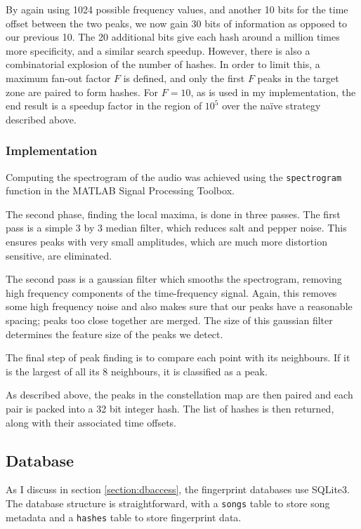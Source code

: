 \documentclass[12pt,a4paper,twoside,openright]{report}
\begin{document}
By again using 1024 possible frequency values, and another 10 bits for the time offset between the two peaks, we now gain 30 bits of information as opposed to our previous 10. The 20 additional bits give each hash around a million times more specificity, and a similar search speedup. However, there is also a combinatorial explosion of the number of hashes. In order to limit this, a maximum fan-out factor $F$ is defined, and only the first $F$ peaks in the target zone are paired to form hashes. For $F=10$, as is used in my implementation, the end result is a speedup factor in the region of $10^5$ over the na{\"i}ve strategy described above.

\subsubsection{Implementation}

Computing the spectrogram of the audio was achieved using the \lstinline{spectrogram} function in the MATLAB Signal Processing Toolbox.

The second phase, finding the local maxima, is done in three passes. The first pass is a simple 3 by 3 median filter, which reduces salt and pepper noise. This ensures peaks with very small amplitudes, which are much more distortion sensitive, are eliminated. 

The second pass is a gaussian filter which smooths the spectrogram, removing high frequency components of the time-frequency signal. Again, this removes some high frequency noise and also makes sure that our peaks have a reasonable spacing; peaks too close together are merged. The size of this gaussian filter determines the feature size of the peaks we detect. 

The final step of peak finding is to compare each point with its neighbours. If it is the largest of all its 8 neighbours, it is classified as a peak.

As described above, the peaks in the constellation map are then paired and each pair is packed into a 32 bit integer hash. The list of hashes is then returned, along with their associated time offsets.


\subsection{Database}
\label{shazam:db}

As I discuss in section \ref{section:dbaccess}, the fingerprint databases use SQLite3. The database structure is straightforward, with a \lstinline{songs} table to store song metadata and a \lstinline{hashes} table to store fingerprint data.
\end{document}
